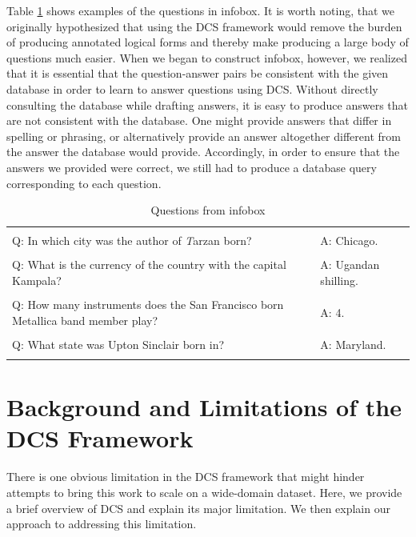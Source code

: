 \documentclass[11pt]{article}
\begin{document}
Table \ref{tb} shows examples of the questions in {\sc infobox}. It is worth noting,
that we originally hypothesized that using the DCS framework would remove the 
burden of producing annotated logical forms and thereby make producing a large
body of questions much easier. When we began to construct {\sc infobox}, however, we
realized that it is essential that the question-answer pairs be consistent with 
the given database in order to learn to answer questions using DCS. Without
directly consulting the database while drafting answers, it is easy to produce
answers that are not consistent with the database. One might provide answers
that differ in spelling or phrasing, or alternatively provide an answer
altogether different from the answer the database would provide. Accordingly, 
in order to ensure that the answers we provided were correct, we still had to produce a
database query corresponding to each question. 
\begin{center}
\begin{table}[ht]
{\small
\hfill{}
\begin{tabular}{|l l|}
\hline
    &\\
    Q: In which city was the author of {\emph Tarzan} born? & A: Chicago. \\&\\
    Q: What is the currency of the country with the capital 
       Kampala? & A: Ugandan shilling. \\ &\\ 
    Q: How many instruments does the San Francisco born Metallica band member
       play? & A: 4. \\&\\  
    Q: What state was Upton Sinclair born in? & A: Maryland. \\&\\
\hline
\end{tabular}}
\hfill{}
\caption{Questions from {\sc infobox}}
\label{tb}
\end{table}
\end{center}
\section{Background and Limitations of the DCS Framework} 
There is one obvious limitation in the DCS framework that might hinder attempts
to bring this work to scale on a wide-domain dataset.  Here, we provide a brief 
overview of DCS and explain its major limitation. We then explain our approach
to addressing this limitation. 
\end{document}
